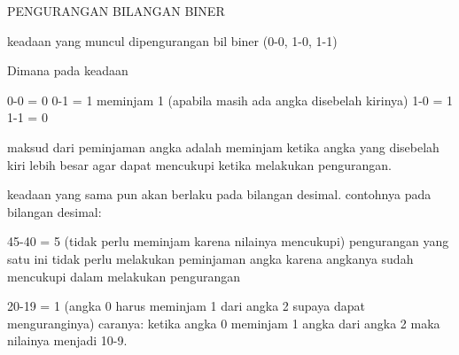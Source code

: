 PENGURANGAN BILANGAN BINER

keadaan yang muncul dipengurangan bil biner
(0-0, 1-0, 1-1)

Dimana pada keadaan

	0-0 = 0
	0-1 = 1 meminjam 1 (apabila masih ada angka disebelah kirinya)
	1-0 = 1
	1-1 = 0
	
maksud dari peminjaman angka adalah meminjam ketika angka yang disebelah kiri lebih besar agar dapat mencukupi ketika melakukan pengurangan.

keadaan yang sama pun akan berlaku pada bilangan desimal.
contohnya pada bilangan desimal:

	45-40 = 5 (tidak perlu meminjam karena nilainya mencukupi)
				pengurangan yang satu ini tidak perlu melakukan peminjaman angka karena angkanya sudah mencukupi dalam melakukan pengurangan
				
	20-19 = 1 (angka 0 harus meminjam 1 dari angka 2 supaya dapat menguranginya)
				caranya: ketika angka 0 meminjam 1 angka dari angka 2 maka nilainya menjadi 10-9.